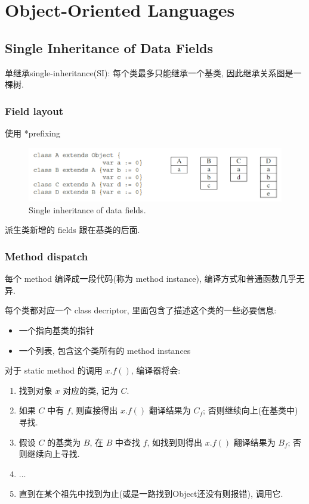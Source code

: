\section{Object-Oriented Languages} 
\subsection{Single Inheritance of Data Fields}
单继承single-inheritance(SI): 每个类最多只能继承一个基类, 因此继承关系图是一棵树. 

\subsubsection{Field layout}
使用 *prefixing

\begin{figure}[H]
    \centering
    \includegraphics[width=0.84\linewidth]{pic/CP14/Single inheritance of data fields.}
    \caption{Single inheritance of data fields.}
\end{figure}
派生类新增的 fields 跟在基类的后面.

\subsubsection{Method dispatch}
每个 method 编译成一段代码(称为 method instance), 编译方式和普通函数几乎无异. 

每个类都对应一个 class decriptor, 里面包含了描述这个类的一些必要信息: 
\begin{itemize}
    \item 一个指向基类的指针
    \item 一个列表, 包含这个类所有的 method instances
\end{itemize}


对于 static method 的调用 $x.f()$, 编译器将会: 
\begin{enumerate}
    \item 找到对象 $x$ 对应的类, 记为 $C$.
    \item 如果 $C$ 中有 $f$, 则直接得出 $x.f()$ 翻译结果为 $C_f$; 否则继续向上(在基类中)寻找. 
    \item 假设 $C$ 的基类为 $B$, 在 $B$ 中查找 $f$, 如找到则得出 $x.f()$ 翻译结果为 $B_f$; 否则继续向上寻找. 
    \item $\dots$
    \item 直到在某个祖先中找到为止(或是一路找到Object还没有则报错), 调用它. 
\end{enumerate}

